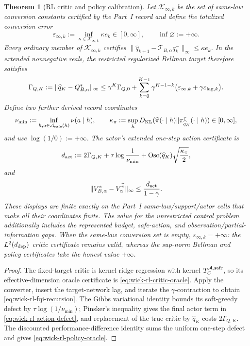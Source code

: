 \documentclass[11pt]{article}
\numberwithin{section}{part}
\theoremstyle{plain}
\newtheorem{theorem}{Theorem}[section]
\theoremstyle{definition}
\theoremstyle{remark}
\begin{document}
\begin{theorem}[RL critic and policy calibration]
Let \(\mathcal K_{\infty,k}\) be the set of same-law conversion constants
certified by the Part~I record and define the totalized conversion error
\begin{equation}
 \label{eq:wick-rl-sup-converter}
 \varepsilon_{\infty,k}
 :=\inf_{\kappa\in\mathcal K_{\infty,k}}\kappa e_k
 \in[0,\infty],
 \qquad \inf\varnothing:=+\infty.
\end{equation}
Every ordinary member of \(\mathcal K_{\infty,k}\) certifies
\(\|\widehat q_{k+1}-\mathcal T_{B,\alpha}q_k^-\|_\infty
\le\kappa e_k\).  In the extended nonnegative reals, the
restricted regularized Bellman target therefore satisfies
\begin{equation}
 \label{eq:wick-rl-fqi-recursion}
 \Gamma_{Q,K}:=\|\widehat q_K-Q_{B,\alpha}^*\|_\infty
 \le\gamma^K\Gamma_{Q,0}
 +\sum_{k=0}^{K-1}\gamma^{K-1-k}
 \bigl(\varepsilon_{\infty,k}
       +\gamma\varepsilon_{{\rm lag},k}\bigr).
\end{equation}
Define two further derived record coordinates
\[
 \nu_{\min}:=\inf_{h,a\in\mathcal A_{\rm safe}(h)}\nu(a\mid h),
 \qquad
 \kappa_\pi:=\sup_hD_{\rm KL}(\widehat\pi(\cdot\mid h)
 \Vert\pi_{\widehat q_K}^\tau(\cdot\mid h))\in[0,\infty],
\]
and use \(\log(1/0):=+\infty\).  The actor's extended one-step action
certificate is
\begin{equation}
 \label{eq:wick-rl-action-defect}
 d_{\rm act}
 :=2\Gamma_{Q,K}
 +\tau\log\frac1{\nu_{\min}}
 +\operatorname{Osc}(\widehat q_K)\sqrt{\frac{\kappa_\pi}{2}},
\end{equation}
and
\begin{equation}
 \label{eq:wick-rl-policy-oracle}
 \|V_{B,\alpha}^*-V_{\alpha}^{\widehat\pi}\|_\infty
 \le\frac{d_{\rm act}}{1-\gamma}.
\end{equation}
These displays are finite exactly on the Part~I same-law/support/actor cells
that make all their coordinates finite.  The value for the unrestricted
control problem additionally includes the
represented budget, safe-action, and observation/partial-information gaps.
When the same-law conversion set is empty,
\(\varepsilon_{\infty,k}=+\infty\):
the \(L^2(d_{\rm dep})\) critic certificate remains valid, whereas the
sup-norm Bellman and policy certificates take the honest value \(+\infty\).
\end{theorem}

\begin{proof}
The fixed-target critic is kernel ridge regression with kernel
\(T_C^{\mathcal A,{\rm safe}}\), so its effective-dimension oracle
certificate is \eqref{eq:wick-rl-critic-oracle}.  Apply the converter,
insert the target-network lag, and iterate the \(\gamma\)-contraction to obtain
\eqref{eq:wick-rl-fqi-recursion}.  The Gibbs variational identity bounds its
soft-greedy defect by \(\tau\log(1/\nu_{\min})\); Pinsker's inequality gives
the final actor term in \eqref{eq:wick-rl-action-defect}, and replacement of
the true critic by \(\widehat q_K\) costs \(2\Gamma_{Q,K}\).  The discounted
performance-difference identity sums the uniform one-step defect and gives
\eqref{eq:wick-rl-policy-oracle}.
\end{proof}
\end{document}
